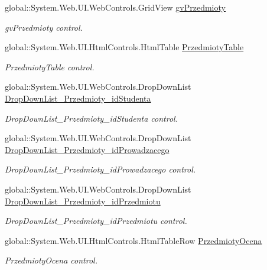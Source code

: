 \begin{DoxyCompactItemize}
global\+::\+System.\+Web.\+U\+I.\+Web\+Controls.\+Grid\+View \hyperlink{class_dziennik_ocen_web2_1_1_web_form1_ab823c042dbbcc237618e27b8734413cb}{gv\+Przedmioty}
\begin{DoxyCompactList}\small\item\em gv\+Przedmioty control. \end{DoxyCompactList}\item 
global\+::\+System.\+Web.\+U\+I.\+Html\+Controls.\+Html\+Table \hyperlink{class_dziennik_ocen_web2_1_1_web_form1_a1a76555165dbd95e98b2ca9324e5b4e7}{Przedmioty\+Table}
\begin{DoxyCompactList}\small\item\em Przedmioty\+Table control. \end{DoxyCompactList}\item 
global\+::\+System.\+Web.\+U\+I.\+Web\+Controls.\+Drop\+Down\+List \hyperlink{class_dziennik_ocen_web2_1_1_web_form1_aaf6a4d83bf0fcef855ca4a3efcf7461d}{Drop\+Down\+List\+\_\+\+Przedmioty\+\_\+id\+Studenta}
\begin{DoxyCompactList}\small\item\em Drop\+Down\+List\+\_\+\+Przedmioty\+\_\+id\+Studenta control. \end{DoxyCompactList}\item 
global\+::\+System.\+Web.\+U\+I.\+Web\+Controls.\+Drop\+Down\+List \hyperlink{class_dziennik_ocen_web2_1_1_web_form1_ac8114888f1541e455e45ae638204aefd}{Drop\+Down\+List\+\_\+\+Przedmioty\+\_\+id\+Prowadzacego}
\begin{DoxyCompactList}\small\item\em Drop\+Down\+List\+\_\+\+Przedmioty\+\_\+id\+Prowadzacego control. \end{DoxyCompactList}\item 
global\+::\+System.\+Web.\+U\+I.\+Web\+Controls.\+Drop\+Down\+List \hyperlink{class_dziennik_ocen_web2_1_1_web_form1_a94670ac4f330ade51b5796c88a5e7129}{Drop\+Down\+List\+\_\+\+Przedmioty\+\_\+id\+Przedmiotu}
\begin{DoxyCompactList}\small\item\em Drop\+Down\+List\+\_\+\+Przedmioty\+\_\+id\+Przedmiotu control. \end{DoxyCompactList}\item 
global\+::\+System.\+Web.\+U\+I.\+Html\+Controls.\+Html\+Table\+Row \hyperlink{class_dziennik_ocen_web2_1_1_web_form1_a5d9a4c5708b84c0eb5cb2de5b8eed5c9}{Przedmioty\+Ocena}
\begin{DoxyCompactList}\small\item\em Przedmioty\+Ocena control. \end{DoxyCompactList}\item 

\end{DoxyCompactItemize}
